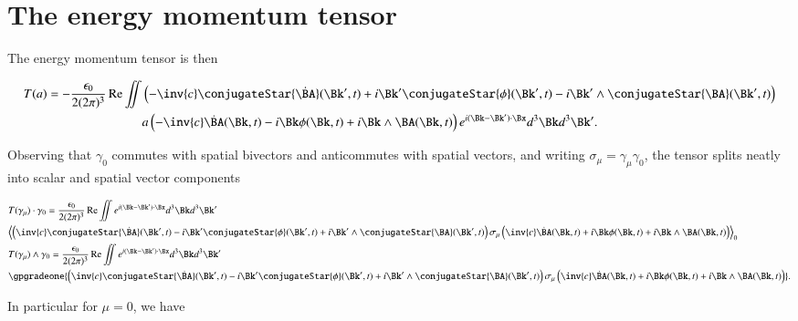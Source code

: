 \section{The energy momentum tensor}

The energy momentum tensor is then

\begin{align*}
T(a) = -\frac{\epsilon_0}{2 (2 \pi)^3} \Real \iint &
\left(
- \inv{c} \conjugateStar{\dot{\BA}}(\Bk',t)
+ i \Bk' \conjugateStar{\phi}(\Bk', t)
- i \Bk' \wedge \conjugateStar{\BA}(\Bk', t)
\right) \\
&a
\left(
- \inv{c} \dot{\BA}(\Bk, t)
- i \Bk \phi(\Bk, t)
+ i \Bk \wedge \BA(\Bk, t)
\right)
e^{i (\Bk -\Bk') \cdot \Bx } d^3 \Bk d^3 \Bk'.
\end{align*}

Observing that $\gamma_0$ commutes with spatial bivectors and anticommutes with spatial vectors, and writing $\sigma_\mu = \gamma_\mu \gamma_0$, the tensor splits neatly into scalar and spatial vector components

\begin{align*}
&T(\gamma_\mu) \cdot \gamma_0 = \frac{\epsilon_0}{2 (2 \pi)^3} \Real \iint 
e^{i (\Bk -\Bk') \cdot \Bx } d^3 \Bk d^3 \Bk' \\
&\gpgradezero{
\left(
\inv{c} \conjugateStar{\dot{\BA}}(\Bk',t)
- i \Bk' \conjugateStar{\phi}(\Bk', t)
+ i \Bk' \wedge \conjugateStar{\BA}(\Bk', t)
\right)
\sigma_\mu
\left(
\inv{c} \dot{\BA}(\Bk, t)
+ i \Bk \phi(\Bk, t)
+ i \Bk \wedge \BA(\Bk, t)
\right)
} \\
&T(\gamma_\mu) \wedge \gamma_0 = \frac{\epsilon_0}{2 (2 \pi)^3} \Real \iint 
e^{i (\Bk -\Bk') \cdot \Bx } d^3 \Bk d^3 \Bk' \\
&\gpgradeone{
\left(
\inv{c} \conjugateStar{\dot{\BA}}(\Bk',t)
- i \Bk' \conjugateStar{\phi}(\Bk', t)
+ i \Bk' \wedge \conjugateStar{\BA}(\Bk', t)
\right)
\sigma_\mu
\left(
\inv{c} \dot{\BA}(\Bk, t)
+ i \Bk \phi(\Bk, t)
+ i \Bk \wedge \BA(\Bk, t)
\right)
}.
\end{align*}

In particular for $\mu = 0$, we have


